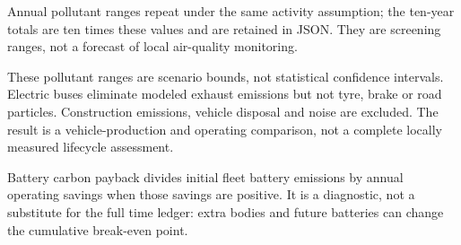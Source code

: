 Annual pollutant ranges repeat under the same activity assumption; the ten-year totals are ten times these values and are retained in JSON. They are screening ranges, not a forecast of local air-quality monitoring.


These pollutant ranges are scenario bounds, not statistical confidence intervals. Electric buses eliminate modeled exhaust emissions but not tyre, brake or road particles. Construction emissions, vehicle disposal and noise are excluded. The result is a vehicle-production and operating comparison, not a complete locally measured lifecycle assessment.


Battery carbon payback divides initial fleet battery emissions by annual operating savings when those savings are positive. It is a diagnostic, not a substitute for the full time ledger: extra bodies and future batteries can change the cumulative break-even point.

